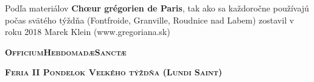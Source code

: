 
\def \feria {A}
\def \feriashort {b}
\def \ohschaptername {c}
\let\feriashort\relax
\let\feria\relax
\clearpage
{}
\begin{center}
Podľa materiálov \textbf{Chœur grégorien de Paris}, 
\linebreak tak ako sa každoročne používajú počas svätého týždňa
\linebreak (Fontfroide, Granville, Roudnice nad Labem)
\linebreak zostavil v roku 2018 Marek Klein (www.gregoriana.sk)
\end{center}
\thispagestyle{empty}
\clearpage
\begin{center}\huge{\textbf{\textsc{Officium\linebreak Hebdomadæ\linebreak Sanctæ}}}\end{center}

\begin{center}\large{\textbf{\textsc{
Feria II\linebreak
Pondelok Veľkého týždňa\linebreak
(Lundi Saint)
}}}\end{center}
\thispagestyle{empty}
\newpage{}



